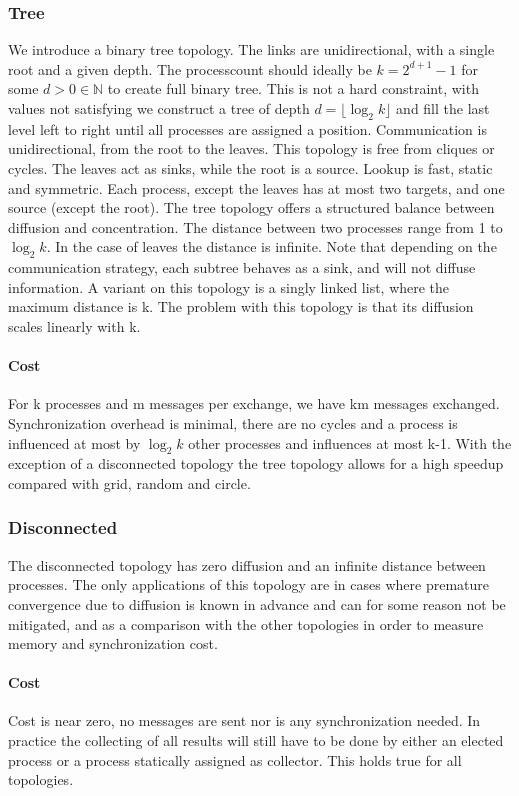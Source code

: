 \subsubsection{Tree}
We introduce a binary tree topology. The links are unidirectional, with a single root and a given depth. The processcount should ideally be $k = 2^{d+1} -1$ for some $d > 0 \in \mathbb{N}$ to create full binary tree. This is not a hard constraint, with values not satisfying we construct a tree of depth $ d =\lfloor\log_2{k}\rfloor$ and fill the last level left to right until all processes are assigned a position. Communication is unidirectional, from the root to the leaves. This topology is free from cliques or cycles. The leaves act as sinks, while the root is a source. Lookup is fast, static and symmetric. Each process, except the leaves has at most two targets, and one source (except the root). The tree topology offers a structured balance between diffusion and concentration. The distance between two processes range from 1 to $\log_2{k}$. In the case of leaves the distance is infinite. Note that depending on the communication strategy, each subtree behaves as a sink, and will not diffuse information.
A variant on this topology is a singly linked list, where the maximum distance is k. The problem with this topology is that its diffusion scales linearly with k.
\paragraph{Cost}
For k processes and m messages per exchange, we have km messages exchanged. Synchronization overhead is minimal, there are no cycles and a process is influenced at most by $\log_2{k}$ other processes and influences at most k-1. With the exception of a disconnected topology the tree topology allows for a high speedup compared with grid, random and circle. 
\subsubsection{Disconnected}
The disconnected topology has zero diffusion and an infinite distance between processes. The only applications of this topology are in cases where premature convergence due to diffusion is known in advance and can for some reason not be mitigated, and as a comparison with the other topologies in order to measure memory and synchronization cost. 
\paragraph{Cost}
Cost is near zero, no messages are sent nor is any synchronization needed. In practice the collecting of all results will still have to be done by either an elected process or a process statically assigned as collector. This holds true for all topologies.
